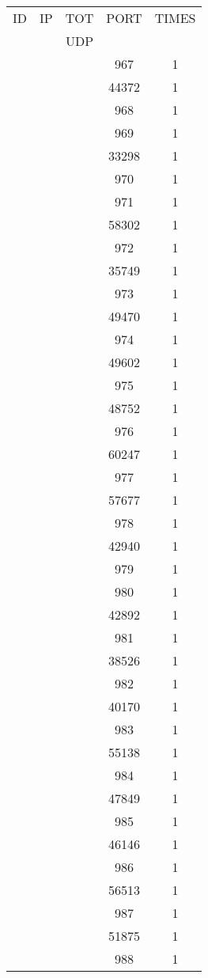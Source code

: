\documentclass[a4paper]{scrartcl}
\begin{document}
\begin{minipage}[b]{0.5\linewidth}
\begin{tabular}{| c | c | c | c | c |}
\hline
ID & IP & TOT & PORT & TIMES \\ 
   &    & UDP &      &       \\ 
\hline
& & & 967 & 1 \\ & & & 44372 & 1 \\ & & & 968 & 1 \\ & & & 969 & 1 \\ & & & 33298 & 1 \\ & & & 970 & 1 \\ & & & 971 & 1 \\ & & & 58302 & 1 \\ & & & 972 & 1 \\ & & & 35749 & 1 \\ & & & 973 & 1 \\ & & & 49470 & 1 \\ & & & 974 & 1 \\ & & & 49602 & 1 \\ & & & 975 & 1 \\ & & & 48752 & 1 \\ & & & 976 & 1 \\ & & & 60247 & 1 \\ & & & 977 & 1 \\ & & & 57677 & 1 \\ & & & 978 & 1 \\ & & & 42940 & 1 \\ & & & 979 & 1 \\ & & & 980 & 1 \\ & & & 42892 & 1 \\ & & & 981 & 1 \\ & & & 38526 & 1 \\ & & & 982 & 1 \\ & & & 40170 & 1 \\ & & & 983 & 1 \\ & & & 55138 & 1 \\ & & & 984 & 1 \\ & & & 47849 & 1 \\ & & & 985 & 1 \\ & & & 46146 & 1 \\ & & & 986 & 1 \\ & & & 56513 & 1 \\ & & & 987 & 1 \\ & & & 51875 & 1 \\ & & & 988 & 1 \\ \hline\end{tabular}\end{minipage} \hfill\begin{minipage}[b]{0.5\linewidth}\begin{tabular}{| c | c | c | c | c |}

\end{tabular}
\end{minipage}
\end{document}
